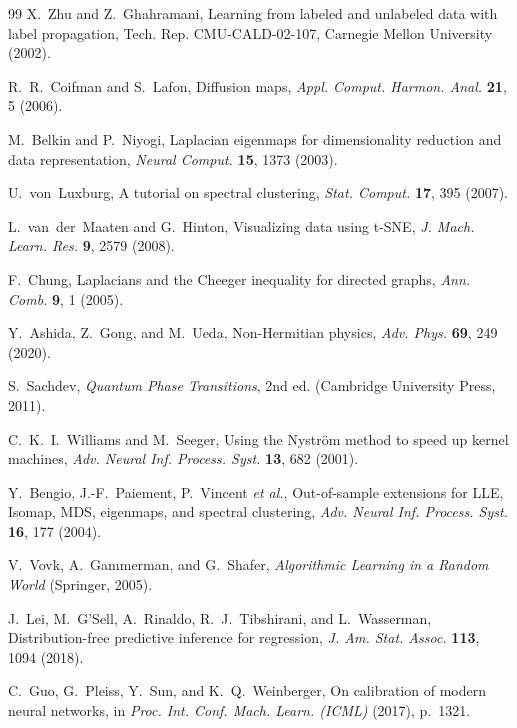 \documentclass[aps,prresearch,reprint,amsmath,amssymb,nofootinbib,superscriptaddress,floatfix]{revtex4-2}
\theoremstyle{definition}
\theoremstyle{remark}
\theoremstyle{plain}
\begin{document}
\begin{thebibliography}{99}
X.~Zhu and Z.~Ghahramani,
Learning from labeled and unlabeled data with label propagation,
Tech. Rep. CMU-CALD-02-107, Carnegie Mellon University (2002).

R.~R.~Coifman and S.~Lafon,
Diffusion maps,
\emph{Appl. Comput. Harmon. Anal.} \textbf{21}, 5 (2006).

M.~Belkin and P.~Niyogi,
Laplacian eigenmaps for dimensionality reduction and data representation,
\emph{Neural Comput.} \textbf{15}, 1373 (2003).

U.~von~Luxburg,
A tutorial on spectral clustering,
\emph{Stat. Comput.} \textbf{17}, 395 (2007).

L.~van~der~Maaten and G.~Hinton,
Visualizing data using t-SNE,
\emph{J. Mach. Learn. Res.} \textbf{9}, 2579 (2008).

F.~Chung,
Laplacians and the Cheeger inequality for directed graphs,
\emph{Ann. Comb.} \textbf{9}, 1 (2005).

Y.~Ashida, Z.~Gong, and M.~Ueda,
Non-Hermitian physics,
\emph{Adv. Phys.} \textbf{69}, 249 (2020).

S.~Sachdev,
\emph{Quantum Phase Transitions}, 2nd ed.
(Cambridge University Press, 2011).

C.~K.~I.~Williams and M.~Seeger,
Using the Nystr\"om method to speed up kernel machines,
\emph{Adv. Neural Inf. Process. Syst.} \textbf{13}, 682 (2001).

Y.~Bengio, J.-F.~Paiement, P.~Vincent \emph{et al.},
Out-of-sample extensions for LLE, Isomap, MDS, eigenmaps, and spectral clustering,
\emph{Adv. Neural Inf. Process. Syst.} \textbf{16}, 177 (2004).

V.~Vovk, A.~Gammerman, and G.~Shafer,
\emph{Algorithmic Learning in a Random World}
(Springer, 2005).

J.~Lei, M.~G'Sell, A.~Rinaldo, R.~J.~Tibshirani, and L.~Wasserman,
Distribution-free predictive inference for regression,
\emph{J. Am. Stat. Assoc.} \textbf{113}, 1094 (2018).

C.~Guo, G.~Pleiss, Y.~Sun, and K.~Q.~Weinberger,
On calibration of modern neural networks,
in \emph{Proc. Int. Conf. Mach. Learn. (ICML)} (2017), p.~1321.


\end{thebibliography}
\end{document}
